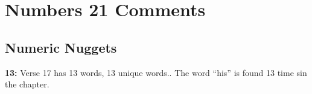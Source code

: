 \section{Numbers 21 Comments}

\subsection{Numeric Nuggets}
\textbf{13: } Verse 17 has 13 words, 13 unique words.. The word ``his'' is found 13 time sin the chapter.